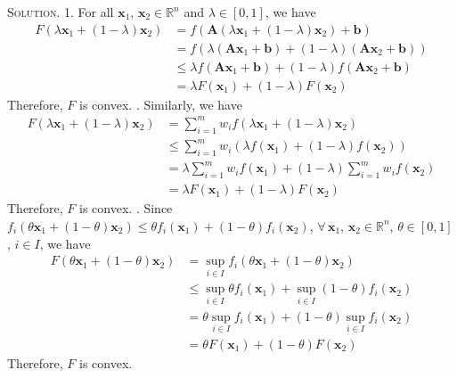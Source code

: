 \documentclass[12pt, a4paper, oneside]{ctexart}
\newenvironment{solution}{\par\noindent\textsc{Solution. }}{\\\par}
\begin{document}
\begin{solution}
	1. For all $\mathbf{x}_1$, $\mathbf{x}_2 \in \mathbb{R}^n$ and $\lambda \in [0, 1]$, we have
	\begin{align*}
		F(\lambda \mathbf{x}_1 + (1 - \lambda) \mathbf{x}_2) & = f(\mathbf{A} (\lambda \mathbf{x}_1 + (1 - \lambda) \mathbf{x}_2) + \mathbf{b}) \\
		& = f(\lambda (\mathbf{Ax}_1 + \mathbf{b}) + (1 - \lambda) (\mathbf{Ax}_2 + \mathbf{b})) \\
		& \leq \lambda f(\mathbf{Ax}_1 + \mathbf{b}) + (1 - \lambda) f(\mathbf{Ax}_2 + \mathbf{b}) \\
		& = \lambda F(\mathbf{x}_1) + (1 - \lambda) F(\mathbf{x}_2)
	\end{align*}
	Therefore, $F$ is convex.
	\newline{}. Similarly, we have
	\begin{align*}
		F(\lambda \mathbf{x}_1 + (1 - \lambda) \mathbf{x}_2) & = \sum_{i = 1}^{m} w_i f(\lambda \mathbf{x}_1 + (1 - \lambda) \mathbf{x}_2) \\
		& \leq \sum_{i = 1}^{m} w_i (\lambda f(\mathbf{x}_1) + (1 - \lambda) f(\mathbf{x}_2)) \\
		& = \lambda \sum_{i = 1}^{m} w_i f(\mathbf{x}_1) + (1 - \lambda) \sum_{i = 1}^{m} w_i f(\mathbf{x}_2) \\
		& = \lambda F(\mathbf{x}_1) + (1 - \lambda) F(\mathbf{x}_2)
	\end{align*}
	Therefore, $F$ is convex.
	\newline{}. Since $f_i(\theta \mathbf{x}_1 + (1 - \theta) \mathbf{x}_2) \leq \theta f_i(\mathbf{x}_1) + (1 - \theta) f_i(\mathbf{x}_2)$, $\forall\, \mathbf{x}_1$, $\mathbf{x}_2 \in \mathbb{R}^n$, $\theta \in [0, 1]$, $i \in I$, we have
	\begin{align*}
		F(\theta \mathbf{x}_1 + (1 - \theta) \mathbf{x}_2) & = \sup_{i \in I} f_i(\theta \mathbf{x}_1 + (1 - \theta) \mathbf{x}_2) \\
		& \leq \sup_{i \in I} \theta f_i(\mathbf{x}_1) + \sup_{i \in I} (1 - \theta) f_i(\mathbf{x}_2) \\
		& = \theta \sup_{i \in I} f_i(\mathbf{x}_1) + (1 - \theta) \sup_{i \in I} f_i(\mathbf{x}_2) \\
		& = \theta F(\mathbf{x}_1) + (1 - \theta) F(\mathbf{x}_2)
	\end{align*}
	Therefore, $F$ is convex.
\end{solution}
\end{document}
